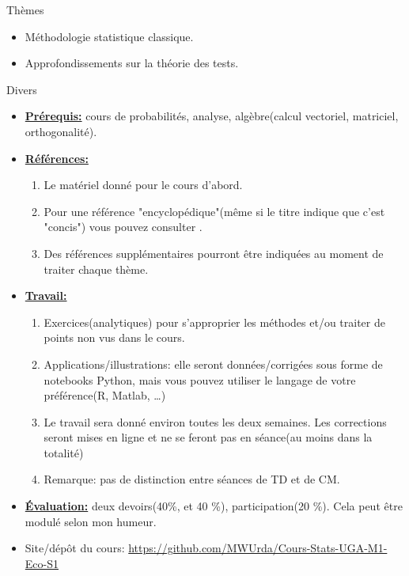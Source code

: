\begin{frame}[allowframebreaks]{Thèmes}
    \begin{itemize}
        \item  Méthodologie statistique classique.
        \item  Approfondissements sur la théorie des tests.
    \end{itemize}
\end{frame}
    

\begin{frame}[allowframebreaks]{Divers}
    \begin{itemize}
        \item \textbf{\underline{Prérequis:}} cours de probabilités, analyse, algèbre(calcul vectoriel, matriciel, orthogonalité).
        \item \textbf{\underline{Références:}} 
        \begin{enumerate}[-]
            \item Le matériel donné pour le cours d'abord.
            \item Pour une référence "encyclopédique"(même si le titre indique que c'est "concis") 
            vous pouvez consulter  \cite{Wasserman2004}.
            \item Des références supplémentaires pourront être indiquées au moment de traiter chaque thème.
        \end{enumerate}
        \framebreak
        \item \textbf{\underline{Travail:}} \begin{enumerate}
            \item Exercices(analytiques) pour s'approprier les méthodes et/ou traiter 
            de points non vus dans le cours.
            \item Applications/illustrations: elle seront données/corrigées sous forme de notebooks
             Python, mais vous pouvez utiliser le langage de votre préférence(R, Matlab, \ldots)
             \item Le travail sera donné environ toutes les deux semaines. 
             Les corrections seront mises en ligne et ne se feront pas en séance(au moins dans la totalité)
            \item Remarque: pas de distinction entre séances de TD et de CM.
        \end{enumerate}
        \framebreak
        \item \textbf{\underline{Évaluation:}} deux devoirs(40\%, et 40 \%), participation(20 \%). Cela peut être modulé 
        selon mon humeur.
        \item Site/dépôt du cours: 
        \medskip
        \url{https://github.com/MWUrda/Cours-Stats-UGA-M1-Eco-S1}
    
    \end{itemize}
    \end{frame}

